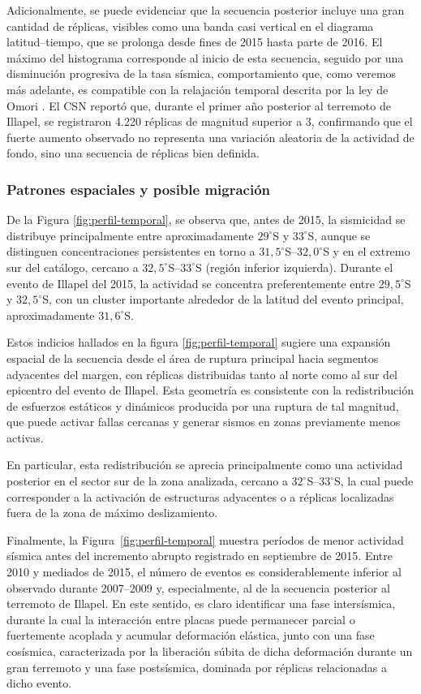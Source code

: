 \documentclass[a4paper,12pt]{article} %
\numberwithin{equation}{section} %
\numberwithin{figure}{section} %
\begin{document}
Adicionalmente, se puede evidenciar que la secuencia posterior incluye una gran cantidad de réplicas, visibles como una banda casi vertical en el diagrama latitud--tiempo, que se prolonga desde fines de 2015 hasta parte de 2016. El máximo del histograma corresponde al inicio de esta secuencia, seguido por una disminución progresiva de la tasa sísmica, comportamiento que, como veremos más adelante, es compatible con la relajación temporal descrita por la ley de Omori \cite{utsu_1995}. El CSN reportó que, durante el primer año posterior al terremoto de Illapel, se registraron 4.220 réplicas de magnitud superior a 3, confirmando que el fuerte aumento observado no representa una variación aleatoria de la actividad de fondo, sino una secuencia de réplicas bien definida.

\subsubsection{Patrones espaciales y posible migración}

De la Figura \ref{fig:perfil-temporal}, se observa que, antes de 2015, la sismicidad se distribuye principalmente entre aproximadamente $29^\circ$S y $33^\circ$S, aunque se distinguen concentraciones persistentes en torno a $31{,}5^\circ$S--$32{,}0^\circ$S y en el extremo sur del catálogo, cercano a $32{,}5^\circ$S--$33^\circ$S (región inferior izquierda). Durante el evento de Illapel del 2015, la actividad se concentra preferentemente entre $29{,}5^\circ$S y $32{,}5^\circ$S, con un cluster importante alrededor de la latitud del evento principal, aproximadamente $31{,}6^\circ$S.

Estos indicios hallados en la figura \ref{fig:perfil-temporal} sugiere una expansión espacial de la secuencia desde el área de ruptura principal hacia segmentos adyacentes del margen, con réplicas distribuidas tanto al norte como al sur del epicentro del evento de Illapel. Esta geometría es consistente con la redistribución de esfuerzos estáticos y dinámicos producida por una ruptura de tal magnitud, que puede activar fallas cercanas y generar sismos en zonas previamente menos activas.

En particular, esta redistribución se aprecia principalmente como una actividad posterior en el sector sur de la zona analizada, cercano a $32^\circ$S--$33^\circ$S, la cual puede corresponder a la activación de estructuras adyacentes o a réplicas localizadas fuera de la zona de máximo deslizamiento.

Finalmente, la Figura~\ref{fig:perfil-temporal} muestra períodos de menor actividad sísmica antes del incremento abrupto registrado en septiembre de 2015. Entre 2010 y mediados de 2015, el número de eventos es considerablemente inferior al observado durante 2007--2009 y, especialmente, al de la secuencia posterior al terremoto de Illapel. En este sentido, es claro identificar una fase intersísmica, durante la cual la interacción entre placas puede permanecer parcial o fuertemente acoplada y acumular deformación elástica, junto con una fase cosísmica, caracterizada por la liberación súbita de dicha deformación durante un gran terremoto y una fase postsísmica, dominada por réplicas relacionadas a dicho evento.
\end{document}

